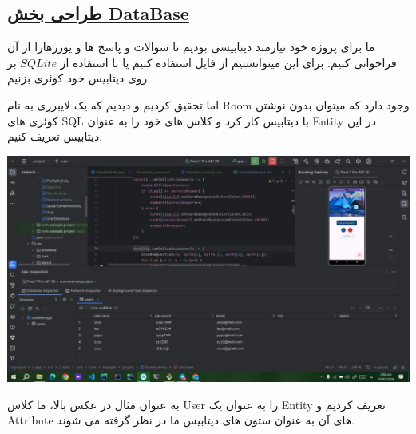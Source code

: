 \subsection*{\underline{طراحی بخش DataBase}}

ما برای پروژه خود نیازمند دیتابیسی بودیم تا سوالات و پاسخ ها و یوزرهارا از آن فراخوانی کنیم.
برای این میتوانستیم از فایل استفاده کنیم یا با استفاده از $SQLite$ بر روی دیتابیس خود کوئری بزنیم.

اما تحقیق کردیم و دیدیم که یک لایبرری به نام Room وجود دارد که میتوان بدون نوشتن کوئری های SQL با دیتابیس کار کرد و کلاس های خود را به عنوان Entity در این دیتابیس تعریف کنیم.


	\includegraphics[width=1\linewidth]{screenshot004}

به عنوان مثال در عکس بالا، ما کلاس User را به عنوان یک Entity تعریف کردیم و Attribute های آن به عنوان ستون های دیتابیس ما در نظر گرفته می شوند.

